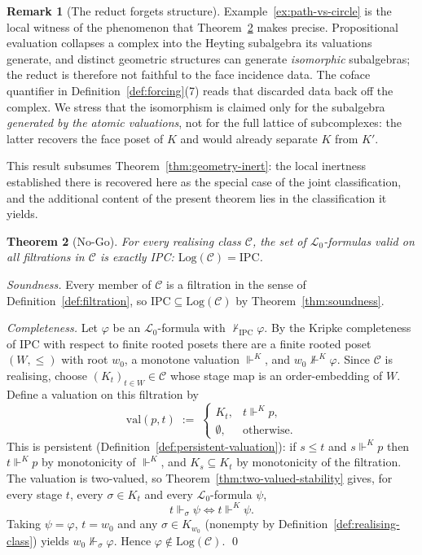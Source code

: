 \documentclass[final,12pt]{elsarticle}
\theoremstyle{plain}
\newtheorem{thm}{Theorem}[section]
\theoremstyle{definition}
\newtheorem{rem}[thm]{Remark}
\begin{document}
\begin{rem}[The reduct forgets structure]
\label{rem:reduct-forgets}
Example~\ref{ex:path-vs-circle} is the local witness of the phenomenon that
Theorem~\ref{thm:no-go} makes precise.  Propositional evaluation collapses a
complex into the Heyting subalgebra its valuations generate, and distinct
geometric structures can generate \emph{isomorphic} subalgebras; the reduct is
therefore not faithful to the face incidence data.  The coface quantifier in
Definition~\ref{def:forcing}(7) reads that discarded data back off the complex.
We stress that the isomorphism is claimed only for the subalgebra
\emph{generated by the atomic valuations}, not for the full lattice of
subcomplexes: the latter recovers the face poset of \(K\) and would already
separate \(K\) from \(K'\).
\end{rem}

This result subsumes Theorem~\ref{thm:geometry-inert}: the local inertness established there is recovered here as the special case of the joint classification, and the additional content of the present theorem lies in the classification it yields.

\begin{thm}[No-Go]
\label{thm:no-go}
For every realising class \(\mathcal{C}\), the set of \(\mathcal{L}_0\)-formulas
valid on all filtrations in \(\mathcal{C}\) is exactly IPC:
\(\mathrm{Log}(\mathcal{C})=\mathrm{IPC}\).
\end{thm}

\proof
\emph{Soundness.}  Every member of \(\mathcal{C}\) is a filtration in the sense
of Definition~\ref{def:filtration}, so \(\mathrm{IPC}\subseteq
\mathrm{Log}(\mathcal{C})\) by Theorem~\ref{thm:soundness}.

\emph{Completeness.}  Let \(\varphi\) be an \(\mathcal{L}_0\)-formula with
\(\nvdash_{\mathrm{IPC}}\varphi\).  By the Kripke completeness of IPC with
respect to finite rooted posets \cite{chagrovzakharyaschev1997} there are a
finite rooted poset \((W,\le)\) with root \(w_0\), a monotone valuation
\(\Vdash^{K}\), and \(w_0\nVdash^{K}\varphi\).  Since \(\mathcal{C}\) is
realising, choose \((K_t)_{t\in W}\in\mathcal{C}\) whose stage map is an
order-embedding of \(W\).  Define a valuation on this filtration by
\[
  \mathrm{val}(p,t)\;:=\;
  \begin{cases}
    K_t, & t\Vdash^{K}p,\\[2pt]
    \emptyset, & \text{otherwise.}
  \end{cases}
\]
This is persistent (Definition~\ref{def:persistent-valuation}): if \(s\le t\)
and \(s\Vdash^{K}p\) then \(t\Vdash^{K}p\) by monotonicity of \(\Vdash^{K}\),
and \(K_s\subseteq K_t\) by monotonicity of the filtration.  The valuation is
two-valued, so Theorem~\ref{thm:two-valued-stability} gives, for every stage
\(t\), every \(\sigma\in K_t\) and every \(\mathcal{L}_0\)-formula \(\psi\),
\[
  t\Vdash_\sigma\psi \iff t\Vdash^{K}\psi .
\]
Taking \(\psi=\varphi\), \(t=w_0\) and any \(\sigma\in K_{w_0}\) (nonempty by
Definition~\ref{def:realising-class}) yields \(w_0\nVdash_\sigma\varphi\).
Hence \(\varphi\notin\mathrm{Log}(\mathcal{C})\).
\qed
\end{document}
